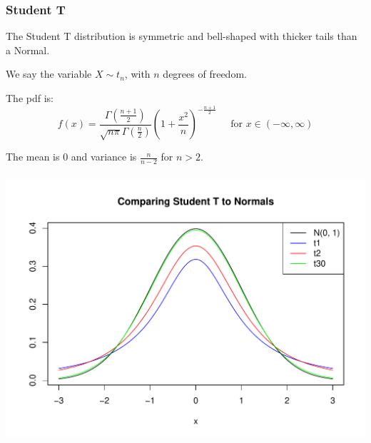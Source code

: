 \documentclass[t,xcolor=pdftex,dvipsnames,table]{beamer}
\makeatletter
\def\maxwidth{ %
  \ifdim\Gin@nat@width>\linewidth
    \linewidth
  \else
    \Gin@nat@width
  \fi
}
\newenvironment{knitrout}{}{} %
\makeatother
\begin{document}
\begin{frame}\frametitle{Student T}

\begin{definition}
The \alert{Student T distribution} is symmetric and bell-shaped with thicker tails than a Normal. 

\vspace{.5cm}
We say the variable $X \sim t_{n}$, with $n$ degrees of freedom.

\vspace{.5cm}
The pdf is:
\[ f(x)  =  \frac{ \Gamma(\frac{n+1}{2})}  { \sqrt{n \pi} \Gamma(\frac{n}{2})}
(1+ \frac{x^2}{n})^{-\frac{n+1}{2}}
\;\;\;\;\; \mbox{for }  x \in (- \infty, \infty) \]
\hyperlink{Normalpdf}{} 

\vspace{.5cm}
The mean is 0 and variance is $\frac{n}{n-2}$ for $n > 2$.

\end{definition}
\end{frame}

\begin{frame}[fragile]\frametitle{}

\begin{knitrout}
\color{fgcolor}
\includegraphics[width=\maxwidth]{figure/unnamed-chunk-23-1} 

\end{knitrout}
\end{frame}
 
\end{document}
